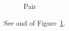 \documentclass{article}
\begin{document}
\begin{figure}
\caption{Pair}\label{fig:pair}
\end{figure}
See  and  of Figure~\ref{fig:pair}.
\end{document}
